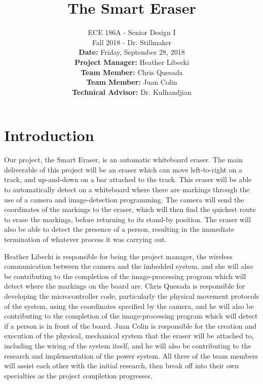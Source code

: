 \documentclass{IEEEtran}					%
\title{\vspace{2in}The Smart Eraser}	%
\author{ECE 186A - Senior Design I \\ 			%
	Fall 2018 - Dr. Stillmaker \\ 				%
	\vspace{12pt} 								%
	\textbf{Date:} Friday, September 28, 2018  \\ 
	\vspace{2in}								%
	\vspace{6pt}
	\textbf{Project Manager:} Heather Libecki			%
	\vspace{12pt}
	\underline{\hspace{3in}}\\					%
	\textbf{Team Member:} Chris Quesada
	\vspace{12pt}
	\underline{\hspace{3in}}\\
	\textbf{Team Member:} Juan Colin
	\vspace{12pt}
	\underline{\hspace{3in}}\\
	\textbf{Technical Advisor:} Dr. Kulhandjian
	\underline{\hspace{3in}} \\
	\vspace{12in}}								%
\begin{document}
	\thispagestyle{empty}						%
	
	\maketitle									%
	
	
	\section{Introduction}
	\setlength{\parindent}{5ex}
	Our project, the Smart Eraser, is an automatic whiteboard eraser. The main deliverable of this project will be an eraser which can move left-to-right on a track, and up-and-down on a bar attached to the track. This eraser will be able to automatically detect on a whiteboard where there are markings through the use of a camera and image-detection programming. The camera will send the coordinates of the markings to the eraser, which will then find the quickest route to erase the markings, before returning to its stand-by position. The eraser will also be able to detect the presence of a person, resulting in the immediate termination of whatever process it was carrying out.\par
	\setlength{\parindent}{5ex}	
	Heather Libecki is responsible for being the project manager, the wireless communication between the camera and the imbedded system, and she will also be contributing to the completion of the image-processing program which will detect where the markings on the board are. Chris Quesada is responsible for developing the microcontroller code, particularly the physical movement protocols of the system, using the coordinates specified by the camera, and he will also be contributing to the completion of the image-processing program which will detect if a person is in front of the board. Juan Colin is responsible for the creation and execution of the physical, mechanical system that the eraser will be attached to, including the wiring of the system itself, and he will also be contributing to the research and implementation of the power system. All three of the team members will assist each other with the initial research, then break off into their own specialties as the project completion progresses.
	
\end{document}
